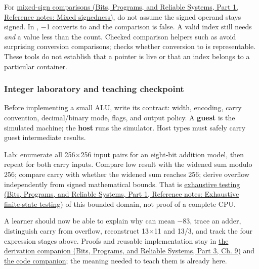 For \href{../01-Bits-Programs-and-Reliable-Systems-P01/main.pdf\#appendix-736a2345de4a}{mixed-sign comparisons (Bits, Programs, and Reliable Systems, Part 1, Reference notes: Mixed signedness)}, do not assume the signed operand stays signed. In , −1 converts to  and the comparison is false. A valid index still needs  \emph{and} a value less than the count. Checked comparison helpers such as  avoid surprising conversion comparisons;  checks whether conversion to  is representable. These tools do not establish that a pointer is live or that an index belongs to a particular container.

\subsubsection{Integer laboratory and teaching checkpoint}\label{05-engine-i-ch001-integer-laboratory-and-teaching-checkpoint}

\hypertarget{05-engine-i-ch001-integer-laboratory-and-teaching-checkpoint}{}

Before implementing a small ALU, write its contract: width, encoding, carry convention, decimal/binary mode, flags, and output policy. A \textbf{guest} is the simulated machine; the \textbf{host} runs the simulator. Host types must safely carry guest intermediate results.

Lab: enumerate all 256×256 input pairs for an eight-bit addition model, then repeat for both carry inputs. Compare low result with the widened sum modulo 256; compare carry with whether the widened sum reaches 256; derive overflow independently from signed mathematical bounds. That is \href{../01-Bits-Programs-and-Reliable-Systems-P01/main.pdf\#appendix-05db24ccc28a}{exhaustive testing (Bits, Programs, and Reliable Systems, Part 1, Reference notes: Exhaustive finite-state testing)} of this bounded domain, not proof of a complete CPU.

A learner should now be able to explain why  can mean −83, trace an adder, distinguish carry from overflow, reconstruct 13×11 and 13/3, and track the four expression stages above. Proofs and reusable implementation stay in \href{../01-Bits-Programs-and-Reliable-Systems-P03/main.pdf\#01-foundations-i-ch011-m002---signed-representations-adders-and-arithmetic-policies}{the derivation companion (Bits, Programs, and Reliable Systems, Part 3, Ch. 9)} and \hyperref[appendix-4e2236f53445-m002---exhaustive-8-bit-addition-oracle-and-saturation]{the code companion}; the meaning needed to teach them is already here.

